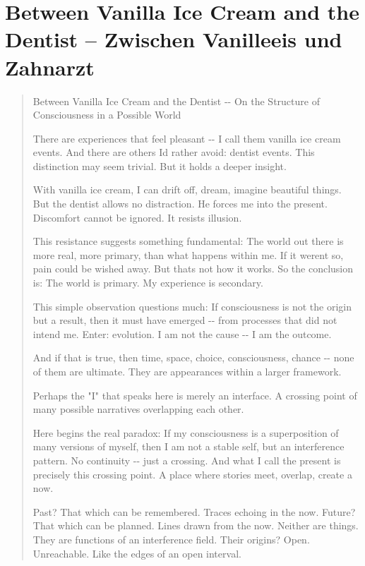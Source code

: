\documentclass[
  ngerman,
]{article}
\begin{document}
\section{\texorpdfstring{\textbf{Between Vanilla Ice Cream and the
Dentist -- Zwischen Vanilleeis und
Zahnarzt}}{Between Vanilla Ice Cream and the Dentist -- Zwischen Vanilleeis und Zahnarzt}}\label{between-vanilla-ice-cream-and-the-dentist-zwischen-vanilleeis-und-zahnarzt}

\begin{quote}
Between Vanilla Ice Cream and the Dentist -\/- On the Structure of
Consciousness in a Possible World

There are experiences that feel pleasant -\/- I call them vanilla ice
cream events. And there are others I\textquotesingle d rather avoid:
dentist events. This distinction may seem trivial. But it holds a deeper
insight.

With vanilla ice cream, I can drift off, dream, imagine beautiful
things. But the dentist allows no distraction. He forces me into the
present. Discomfort cannot be ignored. It resists illusion.

This resistance suggests something fundamental: The world out there is
more real, more primary, than what happens within me. If it
weren\textquotesingle t so, pain could be wished away. But
that\textquotesingle s not how it works. So the conclusion is: The world
is primary. My experience is secondary.

This simple observation questions much: If consciousness is not the
origin but a result, then it must have emerged -\/- from processes that
did not intend me. Enter: evolution. I am not the cause -\/- I am the
outcome.

And if that is true, then time, space, choice, consciousness, chance
-\/- none of them are ultimate. They are appearances within a larger
framework.

Perhaps the "I" that speaks here is merely an interface. A crossing
point of many possible narratives overlapping each other.

Here begins the real paradox: If my consciousness is a superposition of
many versions of myself, then I am not a stable self, but an
interference pattern. No continuity -\/- just a crossing. And what I
call the present is precisely this crossing point. A place where stories
meet, overlap, create a now.

Past? That which can be remembered. Traces echoing in the now. Future?
That which can be planned. Lines drawn from the now. Neither are things.
They are functions of an interference field. Their origins? Open.
Unreachable. Like the edges of an open interval.


\end{quote}
\end{document}
